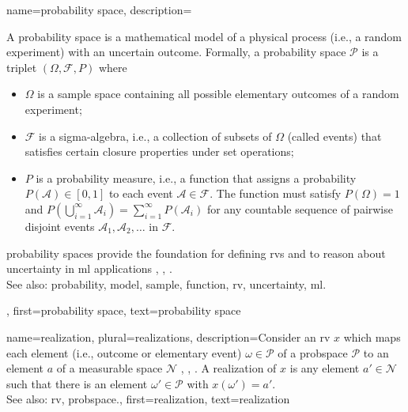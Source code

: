  {name={probability space}, 
 	description={A \gls{probability} space is a mathematical 
 		\gls{model} of a physical process (i.e., a random experiment) with an uncertain outcome. 
 	   	Formally, a \gls{probability} space $\mathcal{P}$ is a triplet $(\Omega, \mathcal{F}, P)$ where
 		\begin{itemize} 
 		\item  $\Omega$ is a \gls{sample} space containing all possible elementary outcomes of a random experiment;
 		\item  $\mathcal{F}$ is a sigma-algebra, i.e., a collection of subsets of $\Omega$ (called events) that satisfies 
 		certain closure properties under set operations;
 		\item $P$ is a \gls{probability} measure, i.e., a \gls{function} that assigns a \gls{probability} $P(\mathcal{A}) \in [0,1]$ 
 		to each event $\mathcal{A} \in \mathcal{F}$. The \gls{function} must satisfy $P(\Omega) = 1$ and 	$
 		P\left(\bigcup_{i=1}^{\infty} \mathcal{A}_i\right) = \sum_{i=1}^{\infty} P(\mathcal{A}_i)$ for any 
 		countable sequence of pairwise disjoint events $\mathcal{A}_1, \mathcal{A}_2, \dots$ in $\mathcal{F}$.
 		\end{itemize}
 		\Gls{probability} spaces provide the foundation for defining \glspl{rv} and to reason about 
 		\gls{uncertainty} in \gls{ml} applications \cite{BillingsleyProbMeasure}, \cite{GrayProbBook}, \cite{ross2013first}.
				\\
		See also: \gls{probability}, \gls{model}, \gls{sample}, \gls{function}, \gls{rv}, \gls{uncertainty}, \gls{ml}.},  
 	first={probability space}, 
 	text={probability space}
 }
 
	
{name={realization}, plural={realizations},
	description={Consider an \gls{rv} $x$ which maps each element 
		(i.e., outcome or elementary event) $\omega \in \mathcal{P}$ of a \gls{probspace} $\mathcal{P}$ 
		to an element $a$ of a measurable space $\mathcal{N}$ \cite{RudinBookPrinciplesMatheAnalysis}, \cite{BillingsleyProbMeasure}, \cite{HalmosMeasure}. 
		A realization of $x$ is any element $a' \in \mathcal{N}$ such that there is 
		an element $\omega' \in \mathcal{P}$ with $x(\omega') = a'$.
			\\
		See also: \gls{rv}, \gls{probspace}.}, 
	first={realization},
	text={realization}  
}

